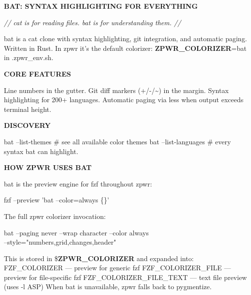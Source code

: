 \documentclass[11pt,a4paper,twoside]{book}
\begin{document}
\vspace{10pt}
{\large\bfseries\color{neoncyan} BAT: SYNTAX HIGHLIGHTING FOR EVERYTHING}\vspace{6pt}

{\small\itshape\color{dimtext} // cat is for reading files. bat is for understanding them. //}

bat is a cat clone with syntax highlighting, git integration, and automatic paging. Written in Rust. In zpwr it's the default colorizer: \textbf{ZPWR\_COLORIZER}=bat in .zpwr\_env.sh.


\vspace{12pt}
{\bfseries\color{neonyellow} CORE FEATURES}\vspace{4pt}

Line numbers in the gutter. Git diff markers (+/-/\textasciitilde{}) in the margin. Syntax highlighting for 200+ languages. Automatic paging via less when output exceeds terminal height.


\vspace{12pt}
{\bfseries\color{neonyellow} DISCOVERY}\vspace{4pt}

bat --list-themes    \# see all available color themes bat --list-languages \# every syntax bat can highlight.


\vspace{12pt}
{\bfseries\color{neonyellow} HOW \textbf{ZPWR} USES BAT}\vspace{4pt}

bat is the preview engine for fzf throughout zpwr:

\begin{codebox}
\color{neongreen}fzf --preview 'bat --color=always \{\}'\\
\end{codebox}

The full zpwr colorizer invocation:

\begin{codebox}
\color{neongreen}bat --paging never --wrap character --color always\\
\color{neongreen}--style="numbers,grid,changes,header"\\
\end{codebox}

This is stored in \$\textbf{ZPWR\_COLORIZER} and expanded into: FZF\_COLORIZER          — preview for generic fzf FZF\_COLORIZER\_FILE     — preview for file-specific fzf FZF\_COLORIZER\_FILE\_TEXT — text file preview (uses -l ASP) When bat is unavailable, zpwr falls back to pygmentize.
\end{document}
